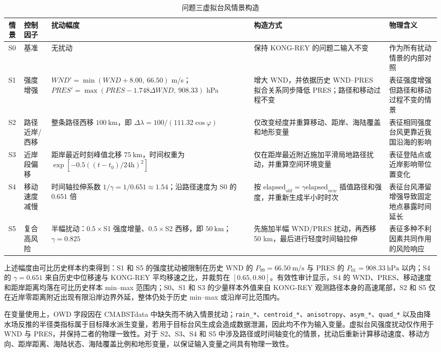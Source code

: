 \documentclass[UTF8,a4paper,zihao=5,fontset=fandol]{ctexart}
\numberwithin{equation}{section}
\numberwithin{figure}{section}
\numberwithin{table}{section}
\begin{document}
\begin{table}[H]
  \centering
  \footnotesize
  \setlength{\tabcolsep}{3pt}
  \renewcommand{\arraystretch}{1.16}
  \caption{问题三虚拟台风情景构造}
  \label{tab:problem3_scenarios}
  \begin{tabularx}{\linewidth}{c p{2.1cm} p{3.9cm} X X}
    \toprule
    情景 & 控制因子 & 扰动幅度 & 构造方式 & 物理含义 \\
    \midrule
    S0 & 基准 & 无扰动 & 保持 KONG-REY 的问题二输入不变 & 作为所有扰动情景的内部对照 \\
    S1 & 强度增强 & $WND'=\min(WND+8.00,\ 66.50)$ m/s；$PRES'=\max(PRES-1.748\Delta WND,\ 908.33)$ hPa & 增大 WND，并依据历史 WND--PRES 拟合关系同步降低 PRES；路径和移动过程不变 & 表征强度增强但路径和移动过程不变的情景 \\
    S2 & 路径近岸/西移 & 整条路径西移 $100\ \mathrm{km}$，即 $\Delta\lambda=100/(111.32\cos\varphi)$ & 仅改变经度并重算移动、距岸、海陆覆盖和地形变量 & 表征相同强度台风更靠近我国沿海的影响 \\
    S3 & 近岸段偏移 & 距岸最近时刻峰值北移 $75\ \mathrm{km}$，时间权重为 $\exp[-0.5((t-t_0)/24\mathrm{h})^2]$ & 仅在距岸最近附近施加平滑局地路径扰动，并重算空间环境变量 & 表征登陆点或近岸影响带位置变化 \\
    S4 & 移动速度减慢 & 时间轴拉伸系数 $1/\gamma=1/0.651\approx1.54$；沿路径速度为 S0 的 $0.651$ 倍 & 按 $\mathrm{elapsed}_{old}=\gamma\mathrm{elapsed}_{new}$ 插值路径和强度，并重新生成半小时时次 & 表征台风滞留增强导致固定地点暴露时间延长 \\
    S5 & 复合高风险 & 半幅扰动：$0.5\times$S1 强度增量、$0.5\times$S2 西移，即 $50\ \mathrm{km}$；$\gamma=0.825$ & 先施加半幅 WND/PRES 扰动，再西移 50 km，最后进行轻度时间轴拉伸 & 表征多种不利因素共同作用的风险响应 \\
    \bottomrule
  \end{tabularx}
\end{table}

上述幅度由可比历史样本约束得到：S1 和 S5 的强度扰动被限制在历史 WND 的 $P_{99}=66.50\ \mathrm{m/s}$ 与 PRES 的 $P_{01}=908.33\ \mathrm{hPa}$ 以内；S4 的 $\gamma=0.651$ 来自历史中位移速与 KONG-REY 平均移速之比，并裁剪在 $[0.65,0.80]$。有效性审计显示，S4 的 WND、PRES、移动速度和距岸距离均落在可比历史样本 min--max 范围内；S0、S1 和 S3 的少量样本外值来自 KONG-REY 观测路径本身的高速尾部，S2 和 S5 仅在近岸零距离附近出现有限沿岸边界外延，整体仍处于历史 min--max 或沿岸可比范围内。

在变量使用上，OWD 字段因在 CMABSTdata 中缺失而不纳入情景扰动；\verb|rain_*|、\verb|centroid_*|、\verb|anisotropy|、\verb|asym_*|、\verb|quad_*| 以及由降水场反推的半径类指标属于目标降水派生变量，若用于目标台风生成会造成数据泄漏，因此均不作为输入变量。虚拟台风强度扰动仅作用于 WND 与 PRES，并保持二者的物理一致性。对于 S2、S3、S4 和 S5 中涉及路径或时间轴变化的情景，扰动后重新计算移动速度、移动方向、距岸距离、海陆状态、海陆覆盖比例和地形变量，以保证输入变量之间具有物理一致性。
\end{document}
